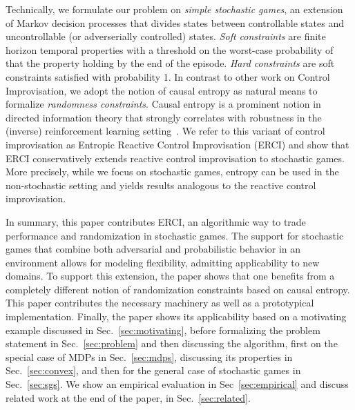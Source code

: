 Technically, we formulate our problem on \emph{simple stochastic
games}, an extension of Markov decision processes that divides states
between controllable states and uncontrollable (or adverserially
controlled) states. \emph{Soft constraints} are finite horizon
temporal properties with a threshold on the worst-case probability of
that the property holding by the end of the episode. \emph{Hard
constraints} are soft constraints satisfied with probability 1. In
contrast to other work on Control Improvisation, we adopt the notion
of causal entropy as natural means to formalize \emph{randomness
constraints}.  Causal entropy is a prominent notion in directed
information theory that strongly correlates with robustness in the
(inverse) reinforcement learning setting~\cite{mceThesis,
maxEntAnswer}. We refer to this variant of control improvisation as
Entropic Reactive Control Improvisation (ERCI) and show that ERCI
conservatively extends reactive control improvisation to stochastic
games. More precisely, while we focus on stochastic games, entropy can
be used in the non-stochastic setting and yields results analogous to
the reactive control improvisation.


%
In summary, this paper contributes ERCI, an algorithmic way to trade
performance and randomization in stochastic games. The support for
stochastic games that combine both adversarial and probabilistic
behavior in an environment allows for modeling flexibility,
admitting applicability to new domains. To support this extension,
the paper shows that one benefits from a completely different notion
of randomization constraints based on causal entropy.  This paper
contributes the necessary machinery as well as a prototypical
implementation. Finally, the paper shows its applicability based on a
motivating example discussed in Sec.~\ref{sec:motivating}, before
formalizing the problem statement in Sec.~\ref{sec:problem} and then
discussing the algorithm, first on the special case of MDPs in
Sec.~\ref{sec:mdps}, discussing its properties in Sec.~\ref{sec:convex}, and then for the general case of stochastic games
in Sec.~\ref{sec:sgs}.  We show an empirical evaluation in
Sec~\ref{sec:empirical} and discuss related work at the end of the
paper, in Sec.~\ref{sec:related}.



